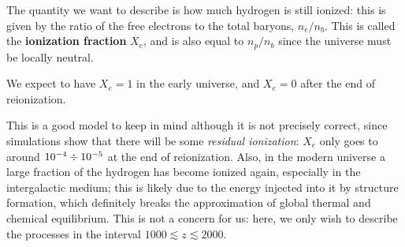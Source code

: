 \documentclass[main.tex]{subfiles}
\begin{document}
The quantity we want to describe is how much hydrogen is still ionized: this is given by the ratio of the free electrons to the total baryons, \(n_e / n_b\). This is called the \textbf{ionization fraction} \(X_e\), and is also equal to \(n_p / n_b\) since the universe must be locally neutral. 

We expect to have \(X_e = 1\) in the early universe, and \(X_e = 0\) after the end of reionization.

This is a good model to keep in mind although it is not precisely correct, since simulations show that there will be some \emph{residual ionization}: \(X_e\) only goes to around \(\num{e-4} \divisionsymbol \num{e-5}\) at the end of reionization.
Also, in the modern universe a large fraction of the hydrogen has become ionized again, especially in the intergalactic medium; this is likely due to the energy injected into it by structure formation, which definitely breaks the approximation of global thermal and chemical equilibrium. 
This is not a concern for us: here, we only wish to describe the processes in the interval \(1000 \lesssim z \lesssim 2000\). 
 



\end{document}
